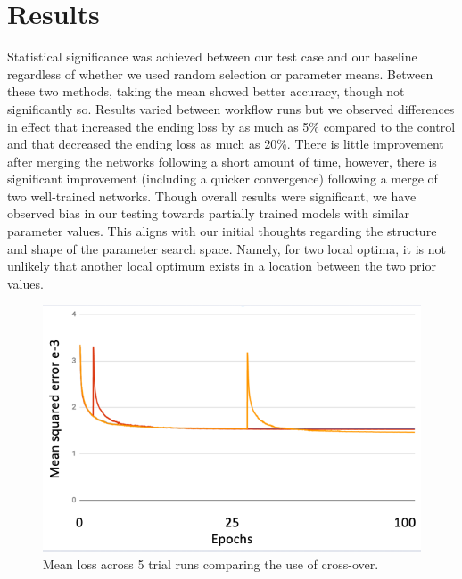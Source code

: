 \section{Results}
\label{sec:results}

Statistical significance was achieved between our test case and our baseline regardless of whether we used random selection or parameter means. Between these two methods, taking the mean showed better accuracy, though not significantly so. Results varied between workflow runs but we observed differences in effect that increased the ending loss by as much as 5\% compared to the control and that decreased the ending loss as much as 20\%. 
There is little improvement after merging the networks following a short amount of time, however, there is significant improvement (including a quicker convergence) following a merge of two well-trained networks.
Though overall results were significant, we have observed bias in our testing towards partially trained models with similar parameter values. This aligns with our initial thoughts regarding the structure and shape of the parameter search space. Namely, for two local optima, it is not unlikely that another local optimum exists in a location between the two prior values.
\begin{figure}[h!]
\includegraphics[width=\linewidth]{figures/loss.png}
\caption{Mean loss across 5 trial runs comparing the use of cross-over.}
\label{fig:results}
\end{figure}
